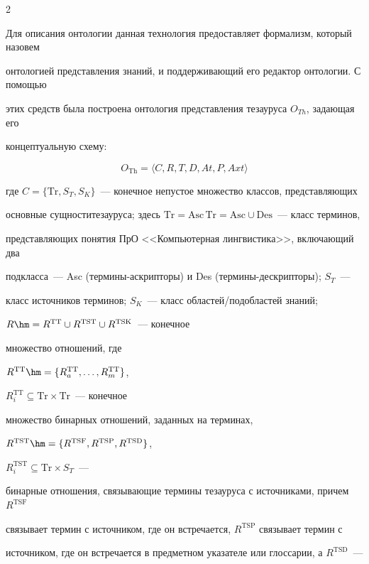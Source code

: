 \begin{multicols}{2}
  

  Для описания онтологии данная технология предоставляет формализм, который назовем 

онтологией представления знаний, и поддерживающий его редактор онтологии. С помощью 

этих средств была построена онтология представления тезауруса $O_{Th}$, задающая его 

концептуальную схему: 

  $$

  O_{\mathrm{Th}} =\big\langle C,R,T,D,At, P,Axt\big\rangle

  $$

  где $C=\{\mathrm{Tr}, S_T,S_K\}$~--- конечное непустое множество классов, представляющих 

основные сущности\linebreak тезауруса; здесь $\mathrm{Tr=Asc\,Tr=Asc\cup Des}$~--- класс терминов, 

представляющих понятия ПрО <<Компьютерная лингвистика>>, включающий два\linebreak 

подкласса~--- Asc (тер\-ми\-ны-аскрип\-то\-ры) и Des (тер\-ми\-ны-де\-скрип\-то\-ры); $S_T$~--- 

класс источников терминов; $S_K$~--- класс областей/подобластей знаний;

  $R\hm=R^{\mathrm{TT}}\cup R^{\mathrm{TST}}\cup R^{\mathrm{TSK}}$~--- конечное\linebreak

   множество отношений, где 

  $R^{\mathrm{TT}}\hm=\{R_a^{\mathrm{TT}},\ldots , R_m^{\mathrm{TT}}\}$, 

  $R_i^{\mathrm{TT}}\subseteq \mathrm{Tr}\times \mathrm{Tr}$~--- конечное 

множество бинарных отношений, заданных на терминах, 

  $R^{\mathrm{TST}}\hm=\{ R^{\mathrm{TSF}}, R^{\mathrm{TSP}}, R^{\mathrm{TSD}}\}$, 

  $R_i^{\mathrm{TST}}\subseteq \mathrm{Tr}\times S_T$~--- 

бинарные отношения, связывающие термины тезауруса с источниками, причем $R^{\mathrm{TSF}}$ 

связывает термин с источником, где он встречается, $R^{\mathrm{TSP}}$ связывает термин с 

источником, где он встречается в предметном указателе или глоссарии, а $R^{\mathrm{TSD}}$~--- 


\end{multicols}
